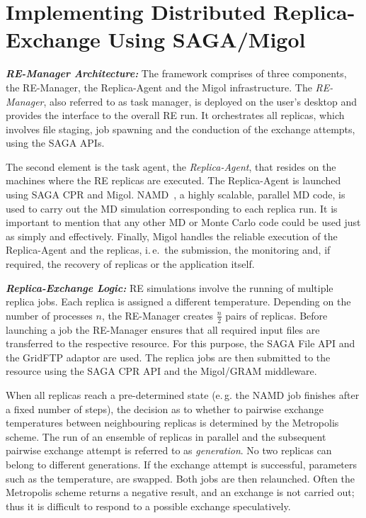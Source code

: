 \documentclass{rspublic}
\newcommand{\replicaagent}[1]{Replica-Agent }
\newcommand{\remanager}[1]{RE-Manager }
\begin{document}
\section{Implementing Distributed Replica-Exchange Using SAGA/Migol}
\label{sec:remd_impl}

{\it \bf RE-Manager Architecture:} The
framework comprises of three components, the RE-Man\-ag\-er,
the Replica-Agent and the Migol infrastructure. 
The  \emph{RE-Manager}, also referred to as task manager,
is deployed on the user's desktop and provides the interface 
to the overall RE run. It orchestrates all replicas, which involves
file staging, job spawning and the conduction of the 
exchange attempts, using the SAGA APIs.                                                                

The second element is the task agent, the \textit{Replica-Agent},
that resides on the machines where the RE replicas
are executed. The \replicaagent\ is launched using SAGA CPR and Migol.
NAMD~\citep{Phillips:2005gd}, a highly scalable, parallel MD code, is
used to carry out the MD simulation corresponding to each replica
run. It is important to mention that any other MD or
Monte Carlo code could be used just as simply and effectively.
Finally, Migol handles the reliable execution of the Replica-Agent and
the replicas, i.\,e.\ the submission, the monitoring and, 
if required, the recovery of replicas or the application itself.

                       
\noindent                                            
{\it \bf Replica-Exchange Logic:} RE simulations involve the running 
of multiple replica jobs.
Each replica is assigned a different temperature.  Depending on the number of
processes $n$, the \remanager\ creates $\frac{n}{2}$ pairs
of replicas.  Before launching a job the \remanager\ ensures that all
required input files are transferred to the respective resource. For
this purpose, the SAGA File API and the GridFTP adaptor are used.  
The replica jobs are then submitted to the resource using the SAGA CPR API and
the Migol/GRAM middleware. 

When all replicas reach a pre-determined state (e.\,g. the NAMD job
finishes after a fixed number of steps), the decision as to whether to
pairwise exchange temperatures between neighbouring replicas is
determined by the Metropolis scheme.  
The run of an ensemble of replicas
in parallel and the subsequent pairwise exchange attempt 
is referred to as \emph{generation}. No two replicas can belong to
different generations.  If the exchange attempt is successful, parameters such as the
temperature, are swapped. Both jobs are then relaunched. 
Often the Metropolis scheme returns a
negative result, and an exchange is not carried out; thus it is
difficult to respond to a possible exchange speculatively.
\end{document}
